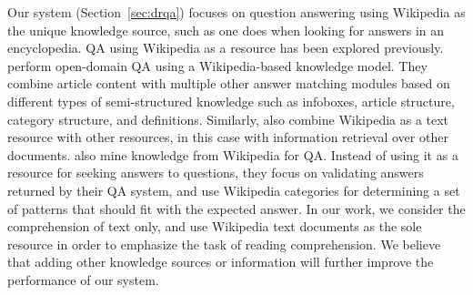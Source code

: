 Our  system (Section~\ref{sec:drqa}) focuses on question answering using Wikipedia as the unique knowledge source, such as one does when looking for answers in an encyclopedia.  QA using Wikipedia as a resource has been explored previously.  perform open-domain QA using a Wikipedia-based knowledge model. They combine article content with multiple other answer matching modules based on different types of semi-structured knowledge such as infoboxes, article structure, category structure, and definitions. Similarly,  also combine Wikipedia as a text resource with other resources, in this case with information retrieval over other documents.  also mine knowledge from Wikipedia for QA. Instead of using it as a resource for seeking answers to questions, they focus on validating answers returned by their QA system, and use Wikipedia categories for determining a set of patterns that should fit with the expected answer. In our work, we consider the comprehension of text only, and use Wikipedia text documents as the sole resource in order to emphasize the task of reading comprehension. We believe that adding other knowledge sources or information will further improve the performance of our system.

